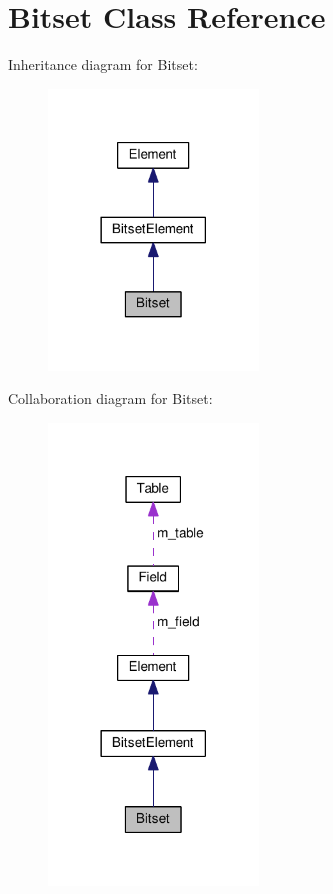 \hypertarget{classBitset}{}\section{Bitset Class Reference}
\label{classBitset}


Inheritance diagram for Bitset\+:
\nopagebreak
\begin{figure}[H]
\begin{center}
\leavevmode
\includegraphics[width=158pt]{classBitset__inherit__graph}
\end{center}
\end{figure}


Collaboration diagram for Bitset\+:
\nopagebreak
\begin{figure}[H]
\begin{center}
\leavevmode
\includegraphics[width=158pt]{classBitset__coll__graph}
\end{center}
\end{figure}
